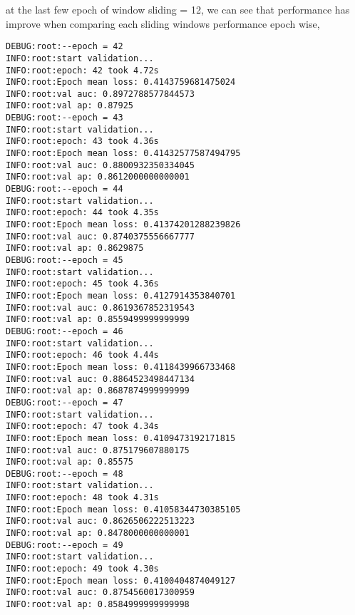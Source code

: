 \documentclass[11pt]{article}
\begin{document}
at the last few epoch of window sliding = 12, we can see that performance has improve when comparing each sliding windows performance epoch wise,
\begin{verbatim}
DEBUG:root:--epoch = 42
INFO:root:start validation...
INFO:root:epoch: 42 took 4.72s
INFO:root:Epoch mean loss: 0.4143759681475024
INFO:root:val auc: 0.8972788577844573
INFO:root:val ap: 0.87925
DEBUG:root:--epoch = 43
INFO:root:start validation...
INFO:root:epoch: 43 took 4.36s
INFO:root:Epoch mean loss: 0.41432577587494795
INFO:root:val auc: 0.8800932350334045
INFO:root:val ap: 0.8612000000000001
DEBUG:root:--epoch = 44
INFO:root:start validation...
INFO:root:epoch: 44 took 4.35s
INFO:root:Epoch mean loss: 0.41374201288239826
INFO:root:val auc: 0.8740375556667777
INFO:root:val ap: 0.8629875
DEBUG:root:--epoch = 45
INFO:root:start validation...
INFO:root:epoch: 45 took 4.36s
INFO:root:Epoch mean loss: 0.4127914353840701
INFO:root:val auc: 0.8619367852319543
INFO:root:val ap: 0.8559499999999999
DEBUG:root:--epoch = 46
INFO:root:start validation...
INFO:root:epoch: 46 took 4.44s
INFO:root:Epoch mean loss: 0.4118439966733468
INFO:root:val auc: 0.8864523498447134
INFO:root:val ap: 0.8687874999999999
DEBUG:root:--epoch = 47
INFO:root:start validation...
INFO:root:epoch: 47 took 4.34s
INFO:root:Epoch mean loss: 0.4109473192171815
INFO:root:val auc: 0.875179607880175
INFO:root:val ap: 0.85575
DEBUG:root:--epoch = 48
INFO:root:start validation...
INFO:root:epoch: 48 took 4.31s
INFO:root:Epoch mean loss: 0.41058344730385105
INFO:root:val auc: 0.8626506222513223
INFO:root:val ap: 0.8478000000000001
DEBUG:root:--epoch = 49
INFO:root:start validation...
INFO:root:epoch: 49 took 4.30s
INFO:root:Epoch mean loss: 0.4100404874049127
INFO:root:val auc: 0.8754560017300959
INFO:root:val ap: 0.8584999999999998
\end{verbatim}
\end{document}
